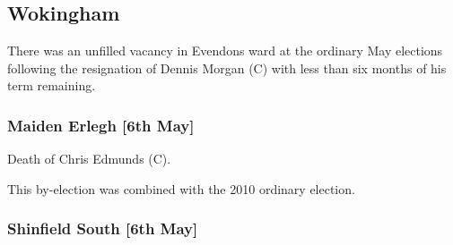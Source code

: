 \begin{resultsiii}
%
%
%
%

\subsection{Wokingham}

There was an unfilled vacancy in Evendons ward at the ordinary May elections following the resignation of Dennis Morgan (C) with less than six months of his term remaining.

\subsubsection*{Maiden Erlegh \hspace*{\fill}\nolinebreak[1]%
\enspace\hspace*{\fill}
[6th May]}


Death of Chris Edmunds (C).

This by-election was combined with the 2010 ordinary election.

\subsubsection*{Shinfield South \hspace*{\fill}\nolinebreak[1]%
\enspace\hspace*{\fill}
[6th May]}



\end{resultsiii}
